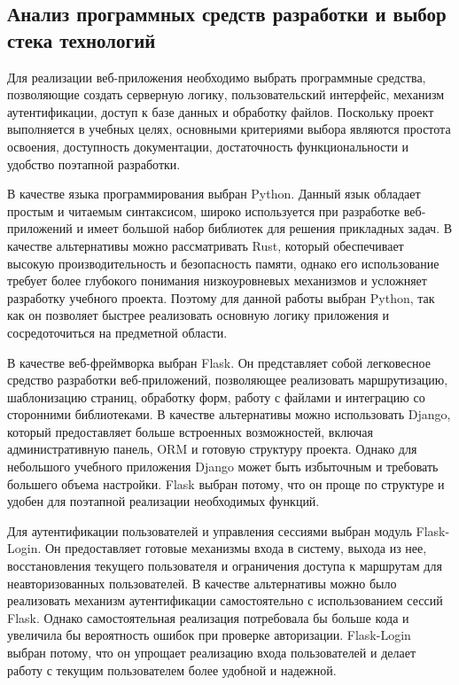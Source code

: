 \subsection{Анализ программных средств разработки и выбор стека технологий}

Для реализации веб-приложения необходимо выбрать программные средства, позволяющие создать серверную логику, пользовательский интерфейс, механизм аутентификации, доступ к базе данных и обработку файлов. Поскольку проект выполняется в учебных целях, основными критериями выбора являются простота освоения, доступность документации, достаточность функциональности и удобство поэтапной разработки.

В качестве языка программирования выбран Python. Данный язык обладает простым и читаемым синтаксисом, широко используется при разработке веб-приложений и имеет большой набор библиотек для решения прикладных задач. В качестве альтернативы можно рассматривать Rust, который обеспечивает высокую производительность и безопасность памяти, однако его использование требует более глубокого понимания низкоуровневых механизмов и усложняет разработку учебного проекта. Поэтому для данной работы выбран Python, так как он позволяет быстрее реализовать основную логику приложения и сосредоточиться на предметной области.

В качестве веб-фреймворка выбран Flask. Он представляет собой легковесное средство разработки веб-приложений, позволяющее реализовать маршрутизацию, шаблонизацию страниц, обработку форм, работу с файлами и интеграцию со сторонними библиотеками. В качестве альтернативы можно использовать Django, который предоставляет больше встроенных возможностей, включая административную панель, ORM и готовую структуру проекта. Однако для небольшого учебного приложения Django может быть избыточным и требовать большего объема настройки. Flask выбран потому, что он проще по структуре и удобен для поэтапной реализации необходимых функций.

Для аутентификации пользователей и управления сессиями выбран модуль Flask-Login. Он предоставляет готовые механизмы входа в систему, выхода из нее, восстановления текущего пользователя и ограничения доступа к маршрутам для неавторизованных пользователей. В качестве альтернативы можно было реализовать механизм аутентификации самостоятельно с использованием сессий Flask. Однако самостоятельная реализация потребовала бы больше кода и увеличила бы вероятность ошибок при проверке авторизации. Flask-Login выбран потому, что он упрощает реализацию входа пользователей и делает работу с текущим пользователем более удобной и надежной.

